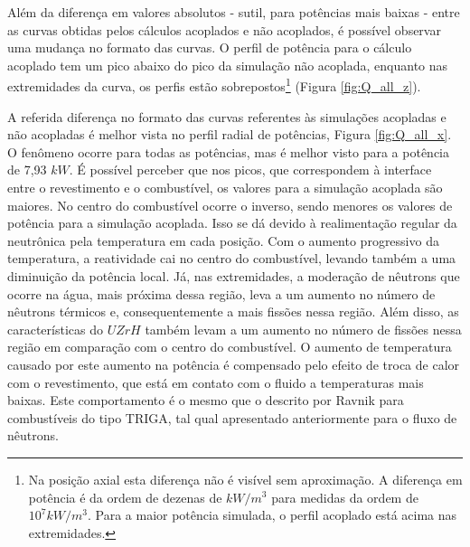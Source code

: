 Além da diferença em valores absolutos - sutil, para potências mais baixas - entre as curvas obtidas pelos
cálculos acoplados e não acoplados, é possível observar uma mudança no formato das curvas. O perfil de
potência para o cálculo acoplado tem um pico abaixo do pico da simulação
não acoplada, enquanto nas extremidades da curva, os perfis estão sobrepostos\footnote{Na posição
  axial esta diferença não é visível sem aproximação. A diferença em potência é da ordem de dezenas de $kW/m^3$ para medidas da
  ordem de $10^7 kW/m^3$. Para a maior potência simulada, o perfil acoplado está acima nas extremidades.} (Figura \ref{fig:Q_all_z}).

A referida diferença no formato das curvas referentes às simulações acopladas e não acopladas é melhor vista no
perfil radial de potências, Figura \ref{fig:Q_all_x}. O fenômeno ocorre para todas as potências, mas é melhor
visto para a potência de 7,93 $kW$. É possível perceber que nos picos, que correspondem à interface entre o
revestimento e o combustível, os valores para a simulação acoplada são maiores. No centro do combustível
ocorre o inverso, sendo menores os valores de potência para a simulação acoplada. Isso se dá devido à realimentação
regular da neutrônica pela temperatura em cada posição. Com o aumento progressivo da temperatura, a reatividade
cai no centro do combustível, levando também a uma diminuição da potência local. Já, nas extremidades, a moderação
de nêutrons que ocorre na água, mais próxima dessa região, leva a um aumento no número de nêutrons térmicos e, consequentemente a mais fissões nessa região.
Além disso, as características do $UZrH$ também levam a um aumento no número de fissões nessa região em comparação com o centro do combustível. O aumento de temperatura
causado por este aumento na potência é compensado pelo efeito de troca de calor com o revestimento, que está em contato com o fluido
a temperaturas mais baixas. Este comportamento é o mesmo que o descrito por Ravnik \cite{Ravnik1990}
para combustíveis do tipo TRIGA, tal qual apresentado anteriormente para o fluxo de nêutrons.

